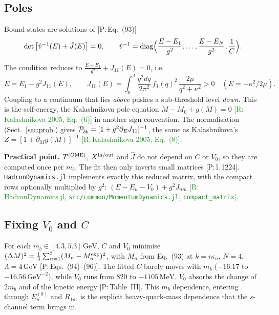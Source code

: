 \documentclass[11pt,a4paper]{article}
\newcommand{\tagP}[1]{\textcolor{blue!65!black}{\textsf{\small[P:\,#1]}}}
\newcommand{\tagR}[1]{\textcolor{ForestGreen}{\textsf{\small[R:\,#1]}}}
\newcommand{\tagD}{\textcolor{orange!85!black}{\textsf{\small[D]}}}
\renewcommand{\TOME}{T^{\rm (OME)}}
\renewcommand{\GeV}{\,\mathrm{GeV}}
\renewcommand{\MeV}{\,\mathrm{MeV}}
\begin{document}
\subsection{Poles}

Bound states are solutions of \tagP{Eq.~(93)}
\begin{equation}
\det\big[\hat v^{-1}(E)+\hat J(E)\big]=0,\qquad \hat v^{-1}={\rm diag}\Big(\frac{E-E_1}{g^2},\dots,\frac{E-E_N}{g^2},\frac1C\Big).
\end{equation}
\begin{derbox}[One bare state, no OME, no contact \tagD]
The condition reduces to $\frac{E-E_1}{g^2}+J_{11}(E)=0$, i.e.
\begin{equation}
E=E_1-g^2J_{11}(E),\qquad J_{11}(E)=\int_0^\Lambda\frac{q^2dq}{2\pi^2}\,f_1(q)^2\,\frac{2\mu}{q^2+\kappa^2}>0\quad(E=-\kappa^2/2\mu).
\end{equation}
Coupling to a continuum that lies \emph{above} pushes a sub-threshold level \emph{down}. This is the self-energy, the Kalashnikova pole equation $M-M_0+g(M)=0$ \tagR{Kalashnikova 2005, Eq.~(6)} in another sign convention. The normalisation (Sect.~\ref{sec:prob}) gives ${\cal P}_{\bar bb}=[1+g^2\partial_EJ_{11}]^{-1}$, the same as Kalashnikova's $Z=[1+\partial_Mg(M)]^{-1}$ \tagR{Kalashnikova 2005, Eq.~(8)}.
\end{derbox}

\textbf{Practical point.} $\TOME$, $X^{\rm in/out}$ and $\hat J$ do not depend on $C$ or $V_0$, so they are computed once per $m_b$. The fit then only inverts small matrices \tagP{l.\,1224}. \texttt{HadronDynamics.jl} implements exactly this reduced matrix, with the compact rows optionally multiplied by $g^2$: $(E-E_n-V_0)+g^2J_{nm}$ \tagR{HadronDynamics.jl, \texttt{src/common/MomentumDynamics.jl}, \texttt{compact\_matrix}}.

\subsection{Fixing $V_0$ and $C$}
For each $m_b\in[4.3,5.3]\GeV$, $C$ and $V_0$ minimise $(\Delta M)^2=\frac13\sum_{n=1}^3(M_n-M_n^{\rm exp})^2$, with $M_n$ from Eq.~(93) at $k=i\kappa_n$, $N=4$, $\Lambda=4\GeV$ \tagP{Eqs.~(94)--(96)}. The fitted $C$ barely moves with $m_b$ ($-16.17$ to $-16.56\GeV^{-2}$), while $V_0$ runs from $820$ to $-1105\MeV$. $V_0$ absorbs the change of $2m_b$ and of the kinetic energy \tagP{Table~III}. This $m_b$ dependence, entering through $E_n^{(0)}$ and $R_{1n}$, is the explicit heavy-quark-mass dependence that the $s$-channel term brings in.
\end{document}
